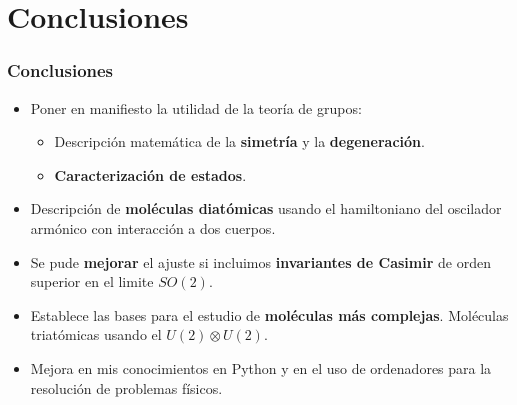 \documentclass{beamer}
\begin{document}
\section{Conclusiones}
\begin{frame}
  \frametitle{Conclusiones}
  \begin{itemize}
    \item Poner en manifiesto la utilidad de la teoría de grupos:
    \begin{itemize}
      \item Descripción matemática de la \textbf{simetría} y la \textbf{degeneración}.
      \item \textbf{Caracterización de estados}.
    \end{itemize}
    \item Descripción de \textbf{moléculas diatómicas} usando el hamiltoniano del oscilador armónico con interacción a dos cuerpos.
    \item Se pude \textbf{mejorar} el ajuste si incluimos \textbf{invariantes de Casimir} de orden superior en el limite $SO(2)$.
    \item Establece las bases para el estudio de \textbf{moléculas más complejas}. Moléculas triatómicas usando el $U(2)\otimes U(2)$.
    \item Mejora en mis conocimientos en Python y en el uso de ordenadores para la resolución de problemas físicos.
  \end{itemize}

\end{frame}
\end{document}

